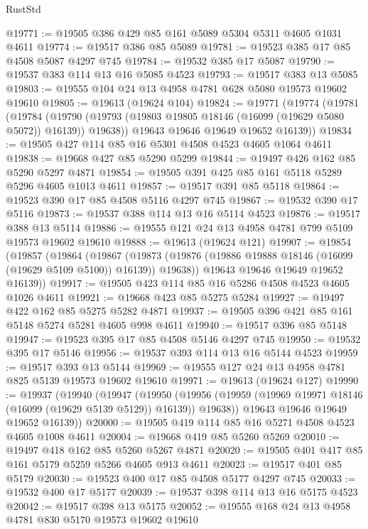 \begin{lexlean}{RustStd}
\begin{coremodule}
@19771 := @19505 @386 @429 @85 @161 @5089 @5304 @5311 @4605 @1031 @4611
@19774 := @19517 @386 @85 @5089
@19781 := @19523 @385 @17 @85 @4508 @5087 @4297 @745
@19784 := @19532 @385 @17 @5087
@19790 := @19537 @383 @114 @13 @16 @5085 @4523
@19793 := @19517 @383 @13 @5085
@19803 := @19555 @104 @24 @13 @4958 @4781 @628 @5080 @19573 @19602 @19610
@19805 := @19613 (@19624 @104)
@19824 := @19771
    (@19774
      (@19781
        (@19784
          (@19790 (@19793 (@19803 @19805 @18146 (@16099 (@19629 @5080 @5072)) @16139)) @19638))
        @19643
        @19646
        @19649
        @19652
        @16139))
@19834 := @19505 @427 @114 @85 @16 @5301 @4508 @4523 @4605 @1064 @4611
@19838 := @19668 @427 @85 @5290 @5299
@19844 := @19497 @426 @162 @85 @5290 @5297 @4871
@19854 := @19505 @391 @425 @85 @161 @5118 @5289 @5296 @4605 @1013 @4611
@19857 := @19517 @391 @85 @5118
@19864 := @19523 @390 @17 @85 @4508 @5116 @4297 @745
@19867 := @19532 @390 @17 @5116
@19873 := @19537 @388 @114 @13 @16 @5114 @4523
@19876 := @19517 @388 @13 @5114
@19886 := @19555 @121 @24 @13 @4958 @4781 @799 @5109 @19573 @19602 @19610
@19888 := @19613 (@19624 @121)
@19907 := @19854
    (@19857
      (@19864
        (@19867
          (@19873 (@19876 (@19886 @19888 @18146 (@16099 (@19629 @5109 @5100)) @16139)) @19638))
        @19643
        @19646
        @19649
        @19652
        @16139))
@19917 := @19505 @423 @114 @85 @16 @5286 @4508 @4523 @4605 @1026 @4611
@19921 := @19668 @423 @85 @5275 @5284
@19927 := @19497 @422 @162 @85 @5275 @5282 @4871
@19937 := @19505 @396 @421 @85 @161 @5148 @5274 @5281 @4605 @998 @4611
@19940 := @19517 @396 @85 @5148
@19947 := @19523 @395 @17 @85 @4508 @5146 @4297 @745
@19950 := @19532 @395 @17 @5146
@19956 := @19537 @393 @114 @13 @16 @5144 @4523
@19959 := @19517 @393 @13 @5144
@19969 := @19555 @127 @24 @13 @4958 @4781 @825 @5139 @19573 @19602 @19610
@19971 := @19613 (@19624 @127)
@19990 := @19937
    (@19940
      (@19947
        (@19950
          (@19956 (@19959 (@19969 @19971 @18146 (@16099 (@19629 @5139 @5129)) @16139)) @19638))
        @19643
        @19646
        @19649
        @19652
        @16139))
@20000 := @19505 @419 @114 @85 @16 @5271 @4508 @4523 @4605 @1008 @4611
@20004 := @19668 @419 @85 @5260 @5269
@20010 := @19497 @418 @162 @85 @5260 @5267 @4871
@20020 := @19505 @401 @417 @85 @161 @5179 @5259 @5266 @4605 @913 @4611
@20023 := @19517 @401 @85 @5179
@20030 := @19523 @400 @17 @85 @4508 @5177 @4297 @745
@20033 := @19532 @400 @17 @5177
@20039 := @19537 @398 @114 @13 @16 @5175 @4523
@20042 := @19517 @398 @13 @5175
@20052 := @19555 @168 @24 @13 @4958 @4781 @830 @5170 @19573 @19602 @19610

\end{coremodule}
\end{lexlean}
